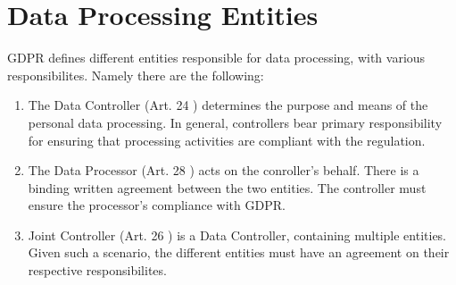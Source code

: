 \documentclass[a4paper,12pt]{report}
\begin{document}
	\section{Data Processing Entities}
	\startsection
	GDPR defines different entities responsible for data processing, with various responsibilites.
	Namely there are the following:
	\begin{enumerate}[]
		\item The Data Controller (Art. 24 \cite{EUdataregulations2018})
		determines the purpose and means of the personal data processing.
		In general, controllers bear primary responsibility for ensuring that processing activities are compliant with the regulation.
		\item The Data Processor (Art. 28 \cite{EUdataregulations2018})
		acts on the conroller's behalf. 
		There is a binding written agreement between the two entities. 
		The controller must ensure the processor's compliance with GDPR.
		\item Joint Controller (Art. 26 \cite{EUdataregulations2018}) is a Data Controller, containing multiple entities.
		Given such a scenario, the different entities must have an agreement on their respective responsibilites.
	\end{enumerate}
	\closesection
\end{document}
